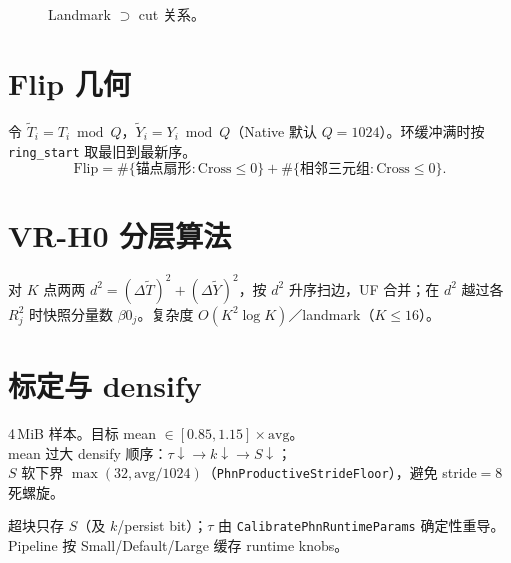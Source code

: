\begin{figure}[htbp]
\centering
{}
\caption{Landmark $\supset$ cut 关系。}
\label{fig:phn-landmarks}
\end{figure}

\section{Flip 几何}

令 $\tilde T_i=T_i\bmod Q$，$\tilde Y_i=Y_i\bmod Q$（Native 默认 $Q=1024$）。环缓冲满时按 \texttt{ring\_start} 取最旧到最新序。
\begin{equation}
\mathrm{Flip}=\#\{\text{锚点扇形}:\mathrm{Cross}\le0\}
+\#\{\text{相邻三元组}:\mathrm{Cross}\le0\}.
\end{equation}

\section{VR-H0 分层算法}

对 $K$ 点两两 $d^2=(\Delta\tilde T)^2+(\Delta\tilde Y)^2$，按 $d^2$ 升序扫边，UF 合并；在 $d^2$ 越过各 $R_j^2$ 时快照分量数 $\beta0_j$。复杂度 $O(K^2\log K)$／landmark（$K\le16$）。

\section{标定与 densify}

4\,MiB 样本。目标 mean $\in[0.85,1.15]\times\mathrm{avg}$。\\
mean 过大 densify 顺序：$\tau\!\downarrow \to k\!\downarrow \to S\!\downarrow$；\\
$S$ 软下界 $\max(32,\mathrm{avg}/1024)$（\texttt{PhnProductiveStrideFloor}），避免 stride$=$8 死螺旋。

超块只存 $S$（及 $k$/persist bit）；$\tau$ 由
\texttt{CalibratePhnRuntimeParams} 确定性重导。\\
Pipeline 按 Small/Default/Large 缓存 runtime knobs。

